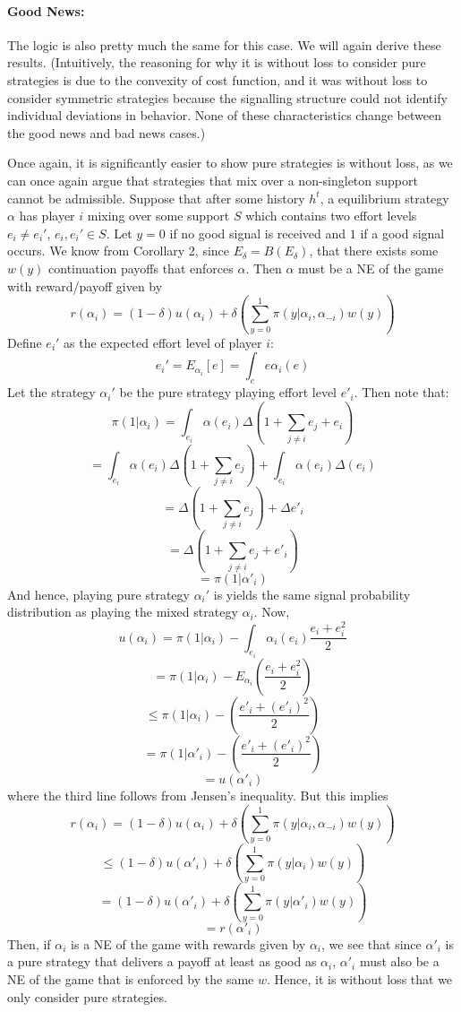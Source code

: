 \documentclass[10pt,letter]{article}
\begin{document}
\paragraph{Good News:}
The logic is also pretty much the same for this case.  We will again derive these results. (Intuitively, the reasoning for why it is without loss to consider pure strategies is due to the convexity of cost function, and it was without loss to consider symmetric strategies because the signalling structure could not identify individual deviations in behavior. None of these characteristics change between the good news and bad news cases.)

Once again, it is significantly easier to show pure strategies is without loss, as we can once again argue that strategies that mix over a non-singleton support cannot be admissible. Suppose that after some history $h^t$, a equilibrium strategy $\alpha$ has player $i$ mixing over some support $S$ which contains two effort levels $e_i \neq e_i'$, $e_i, e_i' \in S$. Let $y = 0$ if no good signal is received and $1$ if a good signal occurs. We know from Corollary 2, since $E_\delta = B(E_\delta)$, that there exists some $w(y)$ continuation payoffs that enforces $\alpha$. Then $\alpha$ must be a NE of the game with reward/payoff given by
\[ r(\alpha_i) = (1-\delta)u(\alpha_i) + \delta \left( \sum_{y=0}^1 \pi(y | \alpha_i, \alpha_{-i}) w(y) \right) \]
Define $e_i'$ as the expected effort level of player $i$:
\[ e_i' = E_{\alpha_i}[e] = \int_e e \alpha_i(e) \]
Let the strategy $\alpha_i'$ be the pure strategy playing effort level $e'_i$. Then note that:
\[ \pi(1 | \alpha_i) = \int_{e_i} \alpha(e_i) \Delta \left( 1 + \sum_{j\neq i} e_j + e_i \right) \]
\[ = \int_{e_i} \alpha(e_i) \Delta \left( 1  + \sum_{j\neq i} e_j\right) + \int_{e_i} \alpha(e_i) \Delta \left(e_i \right) \]
\[ = \Delta \left( 1 +  \sum_{j\neq i} e_j\right) + \Delta e'_i \]
\[ = \Delta \left( 1 +  \sum_{j\neq i} e_j + e'_i\right)\]
\[ = \pi(1 | \alpha'_i) \]
And hence, playing pure strategy $\alpha_i'$ is yields the same signal probability distribution as playing the mixed strategy $\alpha_i$. Now,
\[ u(\alpha_i) = \pi(1 | \alpha_i) - \int_{e_i}\alpha_i(e_i)\frac{e_i + e_i^2}{2} \]
\[ = \pi(1 | \alpha_i) -E_{\alpha_i}\left( \frac{e_i + e_i^2}{2} \right) \]
\[ \le  \pi(1 | \alpha_i) - \left( \frac{e'_i + (e'_i)^2}{2} \right) \]
\[ = \pi(1 | \alpha'_i) - \left( \frac{e'_i + (e'_i)^2}{2} \right) \]
\[ = u(\alpha'_i) \]
where the third line follows from Jensen's inequality. But this implies
\[ r(\alpha_i) = (1-\delta)u(\alpha_i) + \delta \left( \sum_{y=0}^1 \pi(y | \alpha_i, \alpha_{-i}) w(y) \right) \]
\[ \le (1-\delta)u(\alpha'_i) + \delta \left( \sum_{y=0}^1 \pi(y | \alpha_i) w(y) \right)\]
\[ = (1-\delta)u(\alpha'_i) + \delta \left( \sum_{y=0}^1 \pi(y | \alpha'_i) w(y) \right)\]
\[ = r(\alpha'_i) \]
Then, if $\alpha_i$ is a NE of the game with rewards given by $\alpha_i$, we see that since $\alpha'_i$ is a pure strategy that delivers a payoff at least as good as $\alpha_i$, $\alpha'_i$ must also be a NE of the game that is enforced by the same $w$. Hence, it is without loss that we only consider pure strategies.
\end{document}
